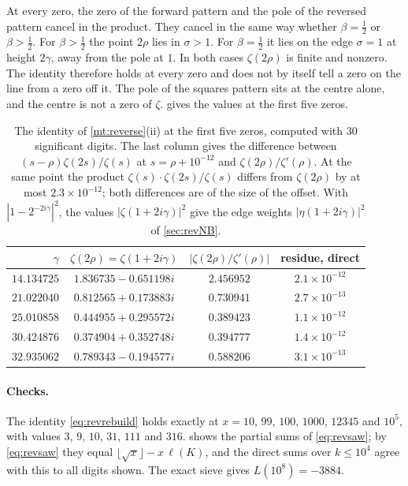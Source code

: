 \documentclass[11pt]{article}
\theoremstyle{definition}\newtheorem{definition}[theorem]{Definition}
\theoremstyle{remark}\newtheorem{remark}[theorem]{Remark}
\theoremstyle{definition}\newtheorem{axiom}{Axiom}
\begin{document}
At every zero, the zero of the forward pattern and the pole of the reversed pattern cancel in the product. They cancel in the same way whether $\beta=\frac12$ or $\beta>\frac12$. For $\beta>\frac12$ the point $2\rho$ lies in $\sigma>1$. For $\beta=\frac12$ it lies on the edge $\sigma=1$ at height $2\gamma$, away from the pole at $1$. In both cases $\zeta(2\rho)$ is finite and nonzero. The identity therefore holds at every zero and does not by itself tell a zero on the line from a zero off it. The pole of the squares pattern sits at the centre alone, and the centre is not a zero of $\zeta$.  gives the values at the first five zeros.

\begin{table}[!htbp]\centering\small
\begin{tabular}{@{}rccc@{}}\toprule
$\gamma$ & $\zeta(2\rho)=\zeta(1+2i\gamma)$ & $|\zeta(2\rho)/\zeta'(\rho)|$ & residue, direct\\\midrule
$14.134725$ & $1.836735-0.651198i$ & $2.456952$ & $2.1\times10^{-12}$\\
$21.022040$ & $0.812565+0.173883i$ & $0.730941$ & $2.7\times10^{-13}$\\
$25.010858$ & $0.444955+0.295572i$ & $0.389423$ & $1.1\times10^{-12}$\\
$30.424876$ & $0.374904+0.352748i$ & $0.394777$ & $1.4\times10^{-12}$\\
$32.935062$ & $0.789343-0.194577i$ & $0.588206$ & $3.1\times10^{-13}$\\\bottomrule
\end{tabular}
\caption{The identity of \cref{mt:reverse}(ii) at the first five zeros, computed with $30$ significant digits. The last column gives the difference between $(s-\rho)\zeta(2s)/\zeta(s)$ at $s=\rho+10^{-12}$ and $\zeta(2\rho)/\zeta'(\rho)$. At the same point the product $\zeta(s)\cdot\zeta(2s)/\zeta(s)$ differs from $\zeta(2\rho)$ by at most $2.3\times10^{-12}$; both differences are of the size of the offset. With $|1-2^{-2i\gamma}|^2$, the values $|\zeta(1+2i\gamma)|^2$ give the edge weights $|\eta(1+2i\gamma)|^2$ of \cref{sec:revNB}.}\label{tab:atzero}
\end{table}

\paragraph{Checks.} The identity \eqref{eq:revrebuild} holds exactly at $x=10$, $99$, $100$, $1000$, $12345$ and $10^5$, with values $3$, $9$, $10$, $31$, $111$ and $316$.  shows the partial sums of \eqref{eq:revsaw}; by \eqref{eq:revsaw} they equal $\lfloor\sqrt x\rfloor-x\,\ell(K)$, and the direct sums over $k\le10^4$ agree with this to all digits shown. The exact sieve gives $L(10^8)=-3884$.
\end{document}
